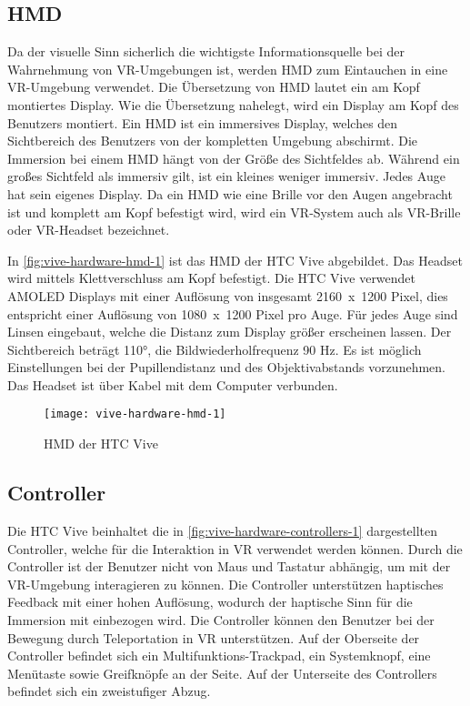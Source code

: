 \subsection{\acl{HMD}}
Da der visuelle Sinn \glqq sicherlich die wichtigste Informationsquelle bei der Wahrnehmung\grqq \cite{DoernerWahrnehmung} von \ac{VR}-Umgebungen ist, werden \ac{HMD} zum Eintauchen in eine \ac{VR}-Umgebung verwendet. Die Übersetzung von \ac{HMD} lautet \glqq ein am Kopf montiertes Display\grqq. Wie die Übersetzung nahelegt, wird ein Display am Kopf des Benutzers montiert. Ein \ac{HMD} ist ein immersives Display, welches den Sichtbereich des Benutzers von der kompletten Umgebung abschirmt. Die Immersion bei einem \ac{HMD} hängt von der Größe des Sichtfeldes ab. Während ein großes Sichtfeld als immersiv gilt, ist ein kleines weniger immersiv. \cite{Doerner2019} Jedes Auge hat sein eigenes Display. Da ein \ac{HMD} wie eine Brille vor den Augen angebracht ist und komplett am Kopf befestigt wird, wird ein \ac{VR}-System auch als \ac{VR}-Brille oder \ac{VR}-Headset bezeichnet.

In \autoref{fig:vive-hardware-hmd-1} ist das \ac{HMD} der HTC Vive abgebildet. Das Headset wird mittels Klettverschluss am Kopf befestigt. Die HTC Vive verwendet AMOLED Displays mit einer Auflösung von insgesamt \mbox{2160 x 1200} Pixel, dies entspricht einer Auflösung von \mbox{1080 x 1200} Pixel pro Auge. Für jedes Auge sind Linsen eingebaut, welche die Distanz zum Display größer erscheinen lassen. Der Sichtbereich beträgt 110°, die Bildwiederholfrequenz 90 Hz. Es ist möglich Einstellungen bei der Pupillendistanz und des Objektivabstands vorzunehmen. Das Headset ist über Kabel mit dem Computer verbunden. \cite{ViveProduct}

\begin{figure}[!htbp]
	\centering
	\texttt{[image: vive-hardware-hmd-1]}
	\caption[HMD der HTC Vive]{\acs{HMD} der HTC Vive \cite{ViveHMD}}
	\label{fig:vive-hardware-hmd-1}
\end{figure}

\subsection{Controller}
Die HTC Vive beinhaltet die in \autoref{fig:vive-hardware-controllers-1} dargestellten Controller, welche für die Interaktion in \ac{VR} verwendet werden können. Durch die Controller ist der Benutzer nicht von Maus und Tastatur abhängig, um mit der \ac{VR}-Umgebung interagieren zu können. Die Controller unterstützen haptisches Feedback mit einer hohen Auflösung, wodurch der haptische Sinn für die Immersion mit einbezogen wird. Die Controller können den Benutzer bei der Bewegung durch Teleportation in \ac{VR} unterstützen. Auf der Oberseite der Controller befindet sich ein Multifunktions-Trackpad, ein Systemknopf, eine Menütaste sowie Greifknöpfe an der Seite. Auf der Unterseite des Controllers befindet sich ein zweistufiger Abzug. \cite{ViveProduct}

